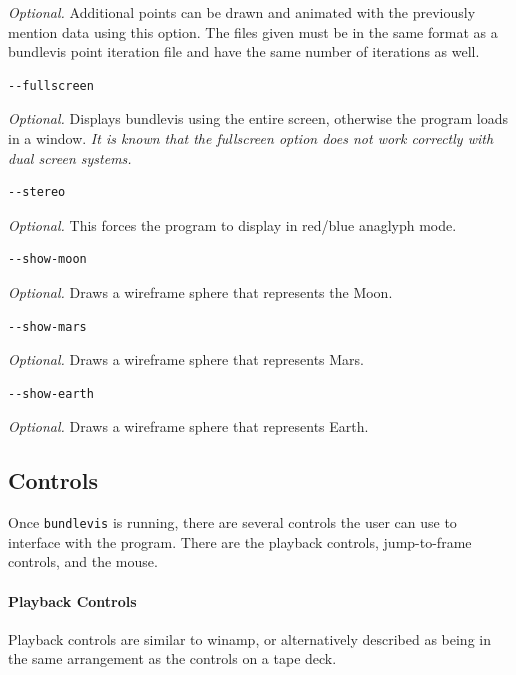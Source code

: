 \emph{Optional.} Additional points can be drawn and animated with the
previously mention data using this option. The files given must be in
the same format as a bundlevis point iteration file and have the same
number of iterations as well.

\begin{verbatim}
--fullscreen
\end{verbatim}

\emph{Optional.} Displays bundlevis using the entire screen, otherwise
the program loads in a window. \emph{It is known that the fullscreen
  option does not work correctly with dual screen systems.}

\begin{verbatim}
--stereo
\end{verbatim}

\emph{Optional.} This forces the program to display in red/blue anaglyph mode.

\begin{verbatim}
--show-moon
\end{verbatim}

\emph{Optional.} Draws a wireframe sphere that represents the Moon.

\begin{verbatim}
--show-mars
\end{verbatim}

\emph{Optional.} Draws a wireframe sphere that represents Mars.

\begin{verbatim}
--show-earth
\end{verbatim}

\emph{Optional.} Draws a wireframe sphere that represents Earth.

\subsection{Controls}

Once \texttt{bundlevis} is running, there are several controls the user can use to interface with the program. There are the playback controls, jump-to-frame controls, and the mouse.

\paragraph{Playback Controls}
Playback controls are similar to winamp, or alternatively described as
being in the same arrangement as the controls on a tape deck.

\newenvironment{myindentpar}[1]
               {\begin{list}{}
                   {\setlength{\leftmargin}{#1}}
                 \item[]
               }
               {\end{list}}


